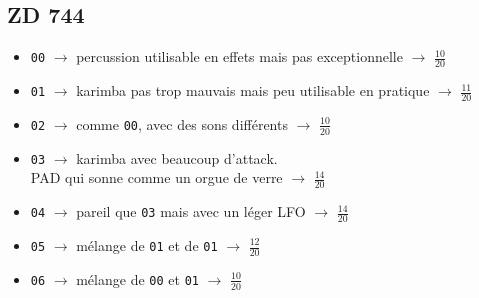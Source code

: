 \documentclass[a4paper, 13pt]{article}
\begin{document}
\vspace{2cm}
\subsection*{ZD 744}
\begin{itemize}
    \item \texttt{00} $\rightarrow$ percussion utilisable en effets mais pas exceptionnelle $\rightarrow$ \Large{$\frac{10}{20}$} \normalsize \vspace{0.2cm}
    \item \texttt{01} $\rightarrow$ karimba pas trop mauvais mais peu utilisable en pratique $\rightarrow$ \Large{$\frac{11}{20}$} \normalsize \vspace{0.2cm}
    \item \texttt{02} $\rightarrow$ comme \texttt{00}, avec des sons différents $\rightarrow$ \Large{$\frac{10}{20}$} \normalsize \vspace{0.2cm}
    \item \texttt{03} $\rightarrow$ karimba avec beaucoup d'attack. \\ PAD qui sonne comme un orgue de verre $\rightarrow$ \Large{$\frac{14}{20}$} \normalsize \vspace{0.2cm}
    \item \texttt{04} $\rightarrow$ pareil que \texttt{03} mais avec un léger LFO $\rightarrow$ \Large{$\frac{14}{20}$} \normalsize \vspace{0.2cm}
    \item \texttt{05} $\rightarrow$ mélange de \texttt{01} et de \texttt{01} $\rightarrow$ \Large{$\frac{12}{20}$} \normalsize \vspace{0.2cm}
    \item \texttt{06} $\rightarrow$ mélange de \texttt{00} et \texttt{01} $\rightarrow$ \Large{$\frac{10}{20}$} \normalsize \vspace{0.2cm}
\end{itemize}


\vspace{2cm}
\end{document}
